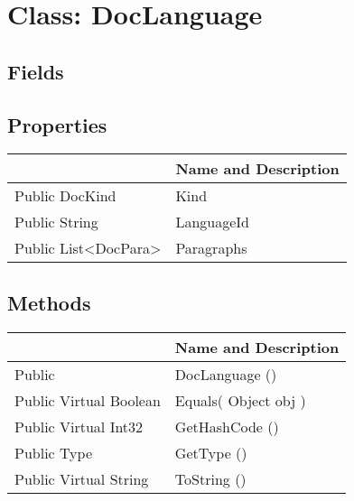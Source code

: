 \documentclass[11pt, oneside, a4paper]{book}
\begin{document}
\hypertarget{SoftwareEngineeringTools.{}Documentation.{}DocLanguage}{}
\section{Class: DocLanguage}

\subsection{Fields}

\subsection{Properties}
\begin{center}
\begin{tabular}{| p{3cm} | p{12cm} | }
\hline
\textbf{ } & \textbf{ Name and Description}\\
\hline
 Public  DocKind &  Kind\hypertarget{SoftwareEngineeringTools.{}Documentation.{}DocLanguage.{}Kind}{}\\
\hline
 Public  String &  LanguageId\hypertarget{SoftwareEngineeringTools.{}Documentation.{}DocLanguage.{}LanguageId}{}\\
\hline
 Public  List<DocPara> &  Paragraphs\hypertarget{SoftwareEngineeringTools.{}Documentation.{}DocLanguage.{}Paragraphs}{}\\
\hline
\end{tabular}
\end{center}

\subsection{Methods}
\begin{center}
\begin{tabular}{| p{3cm} | p{12cm} | }
\hline
\textbf{ } & \textbf{ Name and Description}\\
\hline
 Public  &  DocLanguage ()\hypertarget{SoftwareEngineeringTools.{}Documentation.{}DocLanguage.{}DocLanguage}{}\\
\hline
 Public  Virtual  Boolean &  Equals(\hypertarget{SoftwareEngineeringTools.{}Documentation.{}DocLanguage.{}Equals\_Object}{} Object  obj  )\\
\hline
 Public  Virtual  Int32 &  GetHashCode ()\hypertarget{SoftwareEngineeringTools.{}Documentation.{}DocLanguage.{}GetHashCode}{}\\
\hline
 Public  Type &  GetType ()\hypertarget{SoftwareEngineeringTools.{}Documentation.{}DocLanguage.{}GetType}{}\\
\hline
 Public  Virtual  String &  ToString ()\hypertarget{SoftwareEngineeringTools.{}Documentation.{}DocLanguage.{}ToString}{}\\
\hline
\end{tabular}
\end{center}
 
\end{document}
